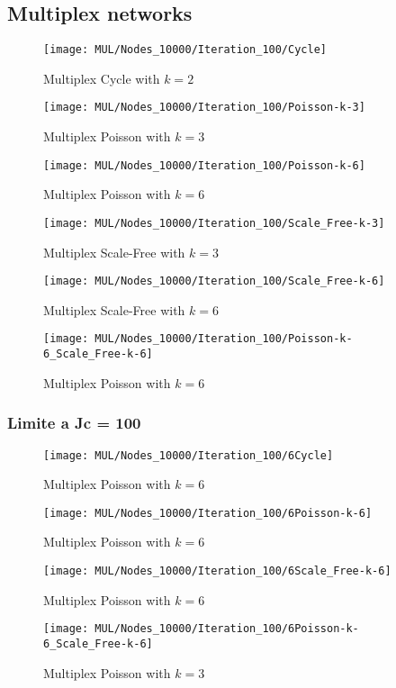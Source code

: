 \subsection{Multiplex networks}\label{subsec:app-multiplex-networks}
    \begin{figure}[H]
        \texttt{[image: MUL/Nodes\_10000/Iteration\_100/Cycle]}\caption{Multiplex Cycle with $k=2$}
        \label{fig:multi_cycle}
    \end{figure}
    \begin{figure}[H]
        \texttt{[image: MUL/Nodes\_10000/Iteration\_100/Poisson-k-3]}\caption{Multiplex Poisson with $k=3$}
        \label{fig:multi_poisson_k_3}
    \end{figure}
    \begin{figure}[H]
        \texttt{[image: MUL/Nodes\_10000/Iteration\_100/Poisson-k-6]}\caption{Multiplex Poisson with $k=6$}
        \label{fig:multi_poisson_k_6}
    \end{figure}
    \begin{figure}[H]
        \texttt{[image: MUL/Nodes\_10000/Iteration\_100/Scale\_Free-k-3]}\caption{Multiplex Scale-Free with $k=3$}
        \label{fig:multi_scale_free_k_3}
    \end{figure}
    \begin{figure}[H]
        \texttt{[image: MUL/Nodes\_10000/Iteration\_100/Scale\_Free-k-6]}\caption{Multiplex Scale-Free with $k=6$}
        \label{fig:multi_scale_free_k_6}
    \end{figure}
    \begin{figure}[H]
        \texttt{[image: MUL/Nodes\_10000/Iteration\_100/Poisson-k-6\_Scale\_Free-k-6]}\caption{Multiplex Poisson with $k=6$}
        \label{fig:multi_poisson_k_6_5}
    \end{figure}

    \subsubsection{Limite a Jc = 100}
    \begin{figure}[H]
        \texttt{[image: MUL/Nodes\_10000/Iteration\_100/6Cycle]}\caption{Multiplex Poisson with $k=6$}
        \label{fig:multi_poisson_k_6_2}
    \end{figure}
    \begin{figure}[H]
        \texttt{[image: MUL/Nodes\_10000/Iteration\_100/6Poisson-k-6]}\caption{Multiplex Poisson with $k=6$}
        \label{fig:multi_poisson_k_6_3}
    \end{figure}
    \begin{figure}[H]
        \texttt{[image: MUL/Nodes\_10000/Iteration\_100/6Scale\_Free-k-6]}\caption{Multiplex Poisson with $k=6$}
        \label{fig:multi_poisson_k_6_4}
    \end{figure}
    \begin{figure}[H]
        \texttt{[image: MUL/Nodes\_10000/Iteration\_100/6Poisson-k-6\_Scale\_Free-k-6]}\caption{Multiplex Poisson with $k=3$}
        \label{fig:multi_poisson_k_3_2}
    \end{figure}
